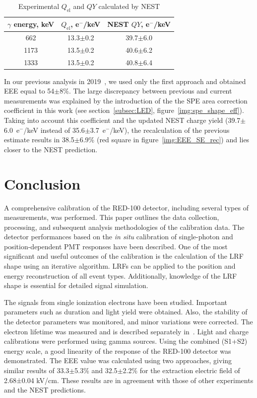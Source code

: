 \documentclass[a4paper,11pt]{article}
\begin{document}
\begin{table}[hbt]
    \centering
        \caption{Experimental $Q_{\text{el}}$ and $QY$ calculated by NEST}
\begin{tabular}{|c|c|c|}
\hline
    $\gamma$ energy, keV & $Q_{\text{el}}$, e$^-$/keV & NEST $QY$, e$^-$/keV\\
    \hline
    \hspace{0.5em}662 & 13.3$\pm$0.2 & 39.7$\pm$6.0\\
    \hline
    1173 & 13.5$\pm$0.2 & 40.6$\pm$6.2\\
    \hline
    1333 & 13.5$\pm$0.2 & 40.8$\pm$6.4\\
    \hline
\end{tabular}    
\label{tab:IY_table}
\end{table}

In our previous analysis in 2019~\cite{RED100_2019}, we used only the first approach and obtained EEE equal to 54$\pm$8\%. The large discrepancy between previous and current measurements was explained by the introduction of the the SPE area correction coefficient in this work (see section~\ref{subsec:LED}, figure~\ref{img:spe_shape_eff}). Taking into account this coefficient and the updated NEST charge yield (39.7$\pm$6.0~e$^-$/keV instead of 35.6$\pm$3.7~e$^-$/keV), the recalculation of the previous estimate results in 38.5$\pm$6.9\% (red square in figure~\ref{img:EEE_SE_rec}) and lies closer to the NEST prediction.

\section{Conclusion}
\label{sec:concl}
A comprehensive calibration of the RED-100 detector, including several types of measurements, was performed. This paper outlines the data collection, processing, and subsequent analysis methodologies of the calibration data. 
The detector performances based on the \textit{in situ} calibration of single-photon and position-dependent PMT responses have been described.
One of the most significant and useful outcomes of the calibration is the calculation of the LRF shape using an iterative algorithm. 
LRFs can be applied to the position and energy reconstruction of all event types. 
Additionally, knowledge of the LRF shape is essential for detailed signal simulation.

The signals from single ionization electrons have been studied. 
Important parameters such as duration and light yield were obtained. Also, the stability of the detector parameters was monitored, and minor variations were corrected. 
The electron lifetime was measured and is described separately in~\cite{The_RED100_Experiment}. 
Light and charge calibrations were performed using gamma sources. 
Using the combined (S1+S2) energy scale, a good linearity of the response of the RED-100 detector was demonstrated. The EEE value was calculated using two approaches, giving similar results of 33.3$\pm$5.3\% and 32.5$\pm$2.2\% for the extraction electric field of 2.68±0.04 kV/cm. These results are in agreement with those of other experiments and the NEST predictions.
\end{document}

